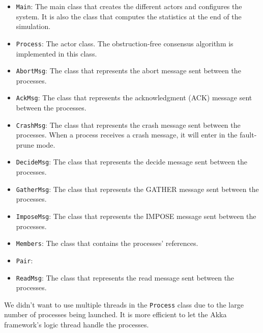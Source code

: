 \documentclass{article}
\begin{document}
\begin{itemize}
    \item \texttt{Main}: The main class that creates the different actors and configures the system. It is also the class that computes the statistics at the end of the simulation.

    \item \texttt{Process}: The actor class. The obstruction-free consensus algorithm is implemented in this class.

    \item \texttt{AbortMsg}: The class that represents the abort message sent between the processes.

    \item \texttt{AckMsg}: The class that represents the acknowledgment (ACK) message sent between the processes.

    \item \texttt{CrashMsg}: The class that represents the crash message sent between the processes. When a process receives a crash message, it will enter in the fault-prune mode.

    \item \texttt{DecideMsg}: The class that represents the decide message sent between the processes.

    \item \texttt{GatherMsg}: The class that represents the GATHER message sent between the processes.
    
    \item \texttt{ImposeMsg}: The class that represents the IMPOSE message sent between the processes.
    
    \item \texttt{Members}: The class that contains the processes' references.
    
    \item \texttt{Pair}:  
    
    \item \texttt{ReadMsg}: The class that represents the read message sent between the processes.
\end{itemize}

We didn't want to use multiple threads in the \texttt{Process} class due to the large number of processes
being launched. It is more efficient to let the Akka framework's logic thread handle the processes.
\end{document}
